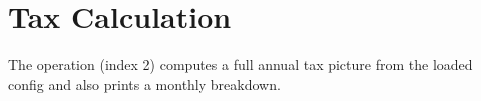\section{Tax Calculation}\label{section:tax_calculation}

The  operation (index 2) computes a full annual tax picture from the loaded config and also prints a monthly breakdown.
